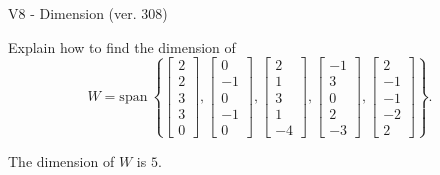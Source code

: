 \begin{exercise}
  \begin{exerciseTitle}V8 - Dimension (ver. 308)\end{exerciseTitle}
  \begin{exerciseStatement}
    Explain how to find the dimension of 
\[W=\mathrm{span}\ \left\{\left[\begin{array}{r}
2 \\
2 \\
3 \\
3 \\
0
\end{array}\right] , \left[\begin{array}{r}
0 \\
-1 \\
0 \\
-1 \\
0
\end{array}\right] , \left[\begin{array}{r}
2 \\
1 \\
3 \\
1 \\
-4
\end{array}\right] , \left[\begin{array}{r}
-1 \\
3 \\
0 \\
2 \\
-3
\end{array}\right] , \left[\begin{array}{r}
2 \\
-1 \\
-1 \\
-2 \\
2
\end{array}\right]\right\}.\]



  \end{exerciseStatement}
  \begin{exerciseAnswer}
   The dimension of \(W\) is  \(5\).
  


  \end{exerciseAnswer}
\end{exercise}